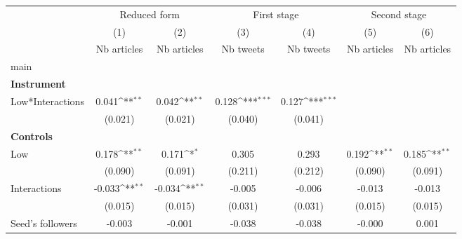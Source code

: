 {
\def\sym#1{\ifmmode^{#1}\else\(^{#1}\)\fi}
\begin{tabular}{l*{6}{c}}
\hline\hline
                    &\multicolumn{2}{c}{Reduced form}           &\multicolumn{2}{c}{First stage}            &\multicolumn{2}{c}{Second stage}           \\\cmidrule(lr){2-3}\cmidrule(lr){4-5}\cmidrule(lr){6-7}
                    &\multicolumn{1}{c}{(1)}&\multicolumn{1}{c}{(2)}&\multicolumn{1}{c}{(3)}&\multicolumn{1}{c}{(4)}&\multicolumn{1}{c}{(5)}&\multicolumn{1}{c}{(6)}\\
                    &\multicolumn{1}{c}{Nb articles}&\multicolumn{1}{c}{Nb articles}&\multicolumn{1}{c}{Nb tweets}&\multicolumn{1}{c}{Nb tweets}&\multicolumn{1}{c}{Nb articles}&\multicolumn{1}{c}{Nb articles}\\
\hline
main                &                     &                     &                     &                     &                     &                     \\
\textbf{Instrument} &                     &                     &                     &                     &                     &                     \\
Low*Interactions    &       0.041\sym{**} &       0.042\sym{**} &       0.128\sym{***}&       0.127\sym{***}&                     &                     \\
                    &     (0.021)         &     (0.021)         &     (0.040)         &     (0.041)         &                     &                     \\
\textbf{Controls}   &                     &                     &                     &                     &                     &                     \\
Low                 &       0.178\sym{**} &       0.171\sym{*}  &       0.305         &       0.293         &       0.192\sym{**} &       0.185\sym{**} \\
                    &     (0.090)         &     (0.091)         &     (0.211)         &     (0.212)         &     (0.090)         &     (0.091)         \\
Interactions        &      -0.033\sym{**} &      -0.034\sym{**} &      -0.005         &      -0.006         &      -0.013         &      -0.013         \\
                    &     (0.015)         &     (0.015)         &     (0.031)         &     (0.031)         &     (0.015)         &     (0.015)         \\
Seed’s followers    &      -0.003         &      -0.001         &      -0.038         &      -0.038         &      -0.000         &       0.001         \\

\end{tabular}}

